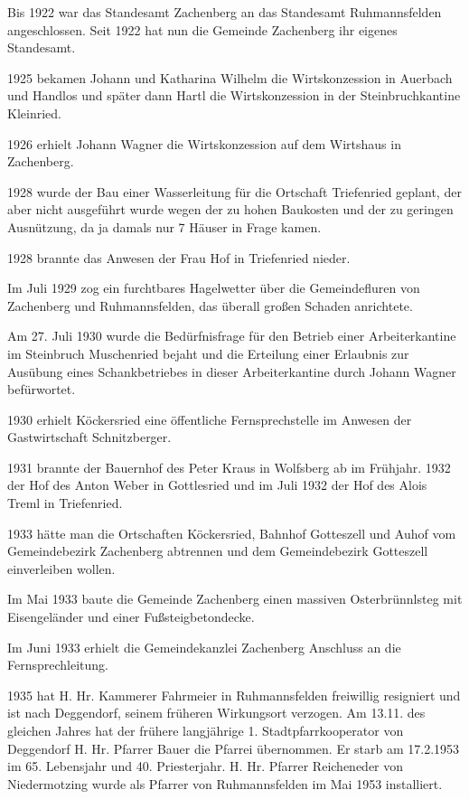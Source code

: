 \documentclass{book}
\begin{document}
Bis 1922 war das Standesamt Zachenberg an das Standesamt Ruhmannsfelden
angeschlossen. Seit 1922 hat nun die Gemeinde Zachenberg ihr eigenes Standesamt.

1925 bekamen Johann und Katharina Wilhelm die Wirtskonzession in Auerbach und
Handlos und später dann Hartl die Wirtskonzession in der Steinbruchkantine
Kleinried.

1926 erhielt Johann Wagner die Wirtskonzession auf dem Wirtshaus in Zachenberg.

1928 wurde der Bau einer Wasserleitung für die Ortschaft Triefenried geplant,
der aber nicht ausgeführt wurde wegen der zu hohen Baukosten und der zu geringen
Ausnützung, da ja damals nur 7 Häuser in Frage kamen.

1928 brannte das Anwesen der Frau Hof in Triefenried nieder.

Im Juli 1929 zog ein furchtbares Hagelwetter über die Gemeindefluren von
Zachenberg und Ruhmannsfelden, das überall großen Schaden anrichtete.

Am 27. Juli 1930 wurde die Bedürfnisfrage für den Betrieb einer Arbeiterkantine
im Steinbruch Muschenried bejaht und die Erteilung einer Erlaubnis zur Ausübung
eines Schankbetriebes in dieser Arbeiterkantine durch Johann Wagner befürwortet.

1930 erhielt Köckersried eine öffentliche Fernsprechstelle im Anwesen der
Gastwirtschaft Schnitzberger.

1931 brannte der Bauernhof des Peter Kraus in Wolfsberg ab im Frühjahr. 1932 der
Hof des Anton Weber in Gottlesried und im Juli 1932 der Hof des Alois Treml in
Triefenried.

1933 hätte man die Ortschaften Köckersried, Bahnhof Gotteszell und Auhof vom
Gemeindebezirk Zachenberg abtrennen und dem Gemeindebezirk Gotteszell
einverleiben wollen.

Im Mai 1933 baute die Gemeinde Zachenberg einen massiven Osterbrünnlsteg mit
Eisengeländer und einer Fußsteigbetondecke.

Im Juni 1933 erhielt die Gemeindekanzlei Zachenberg Anschluss an die
Fernsprechleitung.

1935 hat H. Hr. Kammerer Fahrmeier in Ruhmannsfelden freiwillig resigniert und
ist nach Deggendorf, seinem früheren Wirkungsort verzogen. Am 13.11. des
gleichen Jahres hat der frühere langjährige 1. Stadtpfarrkooperator von
Deggendorf H. Hr. Pfarrer Bauer die Pfarrei übernommen. Er starb am 17.2.1953 im
65. Lebensjahr und 40. Priesterjahr. H. Hr. Pfarrer Reicheneder von
Niedermotzing wurde als Pfarrer von Ruhmannsfelden im Mai 1953 installiert.
\end{document}
